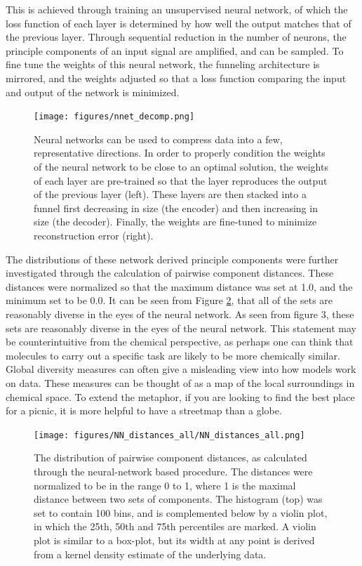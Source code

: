 This is achieved through training an unsupervised neural network, of which the loss function of each layer is determined by how well the output matches that of the previous layer.  Through sequential reduction in the number of neurons, the principle components of an input signal are amplified, and can be sampled.  To fine tune the weights of this neural network, the funneling architecture is mirrored, and the weights adjusted so that a loss function comparing the input and output of the network is minimized.  
\begin{figure}[h!]
\centering
\texttt{[image: figures/nnet\_decomp.png]}
\caption{Neural networks can be used to compress data into a few, representative directions. In order to properly condition the weights of the neural network to be close to an optimal solution, the weights of each layer are pre-trained so that the layer reproduces the output of the previous layer (left).  These layers are then stacked into a funnel first decreasing in size (the encoder) and then increasing in size (the decoder).  Finally, the weights are fine-tuned to minimize reconstruction error (right).}
\label{fig:nn_decomp}
\end{figure}
The distributions of these network derived principle components were further investigated through the calculation of pairwise component distances. These distances were normalized so that the maximum distance was set at 1.0, and the minimum set to be 0.0. It can be seen from Figure \ref{fig:dist_hists}, that all of the sets are reasonably diverse in the eyes of the neural network.  As seen from figure 3, these sets are reasonably diverse in the eyes of the neural network. This statement may be counterintuitive from the chemical perspective, as perhaps one can think that molecules to carry out a specific task are likely to be more chemically similar. Global diversity measures can often give a misleading view into how models work on data. These measures can be thought of as a map of the local surroundings in chemical space.  To extend the metaphor, if you are looking to find the best place for a picnic, it is more helpful to have a streetmap than a globe.
  
  

\begin{figure}[h!]
\centering
\texttt{[image: figures/NN\_distances\_all/NN\_distances\_all.png]}
\caption{The distribution of pairwise component distances, as calculated through the neural-network based procedure.  The distances were normalized to be in the range 0 to 1, where 1 is the maximal distance between two sets of components.  The histogram (top) was set to contain 100 bins, and is complemented below by a violin plot, in which the 25th, 50th and 75th percentiles are marked.  A violin plot is similar to a box-plot, but its width at any point is derived from a kernel density estimate of the underlying data.}
\label{fig:dist_hists}
\end{figure}

